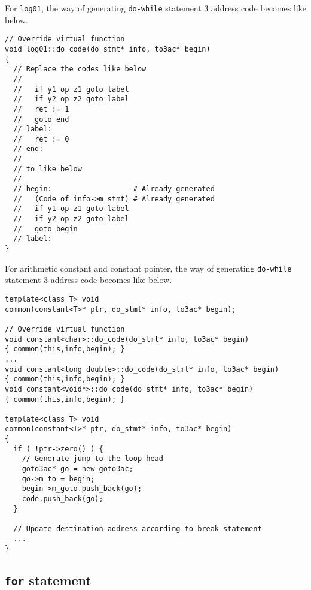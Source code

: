 For {\tt{log01}},
the way of generating {\tt{do-while}} statement 3 address code
becomes like below.
\begin{verbatim}
// Override virtual function
void log01::do_code(do_stmt* info, to3ac* begin)
{
  // Replace the codes like below
  //
  //   if y1 op z1 goto label
  //   if y2 op z2 goto label
  //   ret := 1
  //   goto end
  // label:
  //   ret := 0
  // end:
  //
  // to like below
  //
  // begin:                   # Already generated
  //   (Code of info->m_stmt) # Already generated
  //   if y1 op z1 goto label
  //   if y2 op z2 goto label
  //   goto begin
  // label:
}
\end{verbatim}
For arithmetic constant and constant pointer,
the way of generating {\tt{do-while}} statement 3 address code
becomes like below.
\begin{verbatim}
template<class T> void
common(constant<T>* ptr, do_stmt* info, to3ac* begin);

// Override virtual function
void constant<char>::do_code(do_stmt* info, to3ac* begin)
{ common(this,info,begin); }
...
void constant<long double>::do_code(do_stmt* info, to3ac* begin)
{ common(this,info,begin); }
void constant<void*>::do_code(do_stmt* info, to3ac* begin)
{ common(this,info,begin); }

template<class T> void
common(constant<T>* ptr, do_stmt* info, to3ac* begin)
{
  if ( !ptr->zero() ) {
    // Generate jump to the loop head
    goto3ac* go = new goto3ac;
    go->m_to = begin;
    begin->m_goto.push_back(go);
    code.push_back(go);
  }

  // Update destination address according to break statement
  ...
}
\end{verbatim}

\subsection{{\tt{for}} statement}

